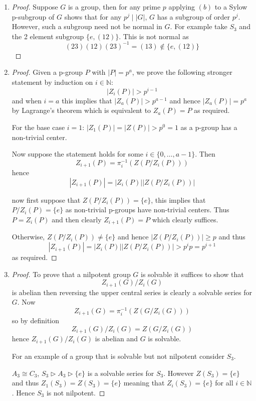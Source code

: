 \documentclass[12pt]{article}
\begin{document}
\begin{enumerate}
    \item[(c)]
    \begin{proof}
        Suppose $G$ is a group, then for any prime $p$ applying $(b)$ to a Sylow p-subgroup
        of $G$ shows that for any $p^j \mid |G|$, $G$ has a subgroup of order $p^j$. However,
        such a subgroup need not be normal in $G$. For example take $S_3$ and the 2 element subgroup
        $\{ e, (12) \}$. This is not normal as
        \[ (23)(12)(23)^{-1} = (13) \notin \{ e, (12) \} \]
    \end{proof}

    \item[(d)]
    \begin{proof}
        Given a p-group $P$ with $|P| = p^a$, we prove the following stronger statement by induction on $i \in \mathbb N$:
        \[ |Z_i(P)| > p^{i-1} \]
        and when $i = a$ this implies that $|Z_a(P)| > p^{a-1}$ and hence $|Z_a(P)| = p^a$ by Lagrange's theorem
        which is equivalent to $Z_a(P) = P$ as required.

        For the base case $i = 1$: $|Z_1(P)| = |Z(P)| > p^0 = 1$ as a p-group has a non-trivial center.

        Now suppose the statement holds for some $i \in \{ 0, \ldots, a-1\}$. Then
        \[ Z_{i+1}(P) = \pi_i^{-1}(Z(P/Z_i(P))) \]
        hence
        \[ |Z_{i+1}(P)| = |Z_i(P)||Z(P/Z_i(P))| \]

        now first suppose that $Z(P/Z_i(P)) = \{ e \}$, this implies that $P/Z_i(P) = \{ e \}$
        as non-trivial p-groups have non-trivial centers. Thus $P = Z_i(P)$ and then clearly
        $Z_{i+1}(P) = P$ which clearly suffices.

        Otherwise, $Z(P/Z_i(P)) \neq \{ e \}$ and hence $|Z(P/Z_i(P))| \geq p$ and thus
        \[ |Z_{i+1}(P)| = |Z_i(P)||Z(P/Z_i(P))| > p^ip = p^{i+1} \]
        as required.
    \end{proof}

    \item[(e)]
    \begin{proof}
        To prove that a nilpotent group $G$ is solvable it suffices to show that
        \[ Z_{i+1}(G)/Z_{i}(G) \]
        is abelian then reversing the upper central series is clearly a solvable series for $G$.
        Now
        \[ Z_{i+1}(G) = \pi_i^{-1}(Z(G/Z_{i}(G))) \]
        so by definition
        \[ Z_{i+1}(G)/Z_i(G) = Z(G/Z_i(G)) \]
        hence $Z_{i+1}(G)/Z_i(G)$ is abelian and $G$ is solvable.

        For an example of a group that is solvable but not nilpotent consider $S_3$.

        $A_3 \cong C_3$, $S_3 \rhd A_3 \rhd \{e\}$ is a solvable series for $S_3$.
        However $Z(S_3) = \{e \}$ and thus $Z_1(S_3) = Z(S_3) = \{ e \}$ meaning
        that $Z_i(S_3) = \{e \}$ for all $i \in \mathbb N$. Hence $S_3$ is not nilpotent.
    \end{proof}
\end{enumerate}
\end{document}
